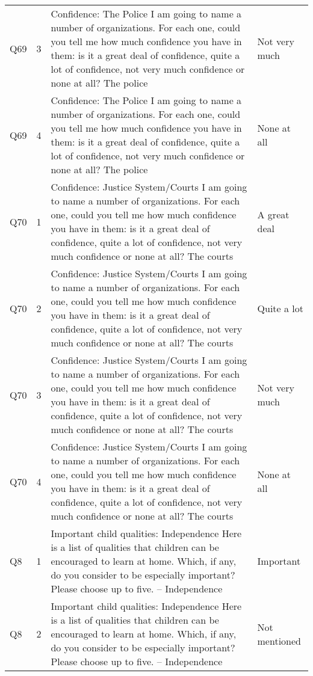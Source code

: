 \begin{tabular}{lrll}
Q69 & 3 & Confidence: The Police I am going to name a number of organizations. For each one, could you tell me how much confidence you have in them: is it a great deal of confidence, quite a lot of confidence, not very much confidence or none at all? The police & Not very much \\
Q69 & 4 & Confidence: The Police I am going to name a number of organizations. For each one, could you tell me how much confidence you have in them: is it a great deal of confidence, quite a lot of confidence, not very much confidence or none at all? The police & None at all \\
Q70 & 1 & Confidence: Justice System/Courts I am going to name a number of organizations. For each one, could you tell me how much confidence you have in them: is it a great deal of confidence, quite a lot of confidence, not very much confidence or none at all? The courts & A great deal \\
Q70 & 2 & Confidence: Justice System/Courts I am going to name a number of organizations. For each one, could you tell me how much confidence you have in them: is it a great deal of confidence, quite a lot of confidence, not very much confidence or none at all? The courts & Quite a lot \\
Q70 & 3 & Confidence: Justice System/Courts I am going to name a number of organizations. For each one, could you tell me how much confidence you have in them: is it a great deal of confidence, quite a lot of confidence, not very much confidence or none at all? The courts & Not very much \\
Q70 & 4 & Confidence: Justice System/Courts I am going to name a number of organizations. For each one, could you tell me how much confidence you have in them: is it a great deal of confidence, quite a lot of confidence, not very much confidence or none at all? The courts & None at all \\
Q8 & 1 & Important child qualities: Independence  Here is a list of qualities that children can be encouraged to learn at home. Which, if any, do you consider to be especially important? Please choose up to five. – Independence & Important \\
Q8 & 2 & Important child qualities: Independence  Here is a list of qualities that children can be encouraged to learn at home. Which, if any, do you consider to be especially important? Please choose up to five. – Independence & Not mentioned \\
\bottomrule
\end{tabular}
